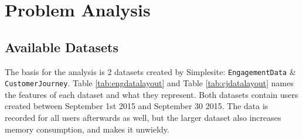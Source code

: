 \section{Problem Analysis}


\subsection{Available Datasets}

The basis for the analysis is 2 datasets created by Simplesite:
\texttt{EngagementData} \& \texttt{CustomerJourney}. Table
\ref{tab:engdatalayout} and Table \ref{tab:cjdatalayout} names the features of
each dataset and what they represent. Both datasets contain users created
between September 1st 2015 and September 30 2015.  The data is recorded for
all users afterwards as well, but the larger dataset also increases memory
consumption, and makes it unwieldy.

